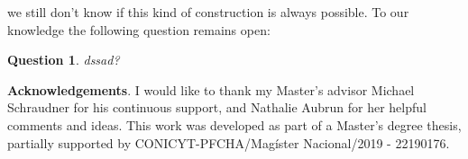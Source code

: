 \documentclass[letterpaper,10pt]{article}
\theoremstyle{plain}
\newtheorem*{question*}{Question}
\begin{document}
	
	\newpage 
	
we still don't know if this kind of construction is always possible. To our knowledge the following question remains open:
	\begin{question*}
	dssad?
	\end{question*}
	
	
	\textbf{Acknowledgements}. I would like to thank my Master's advisor Michael Schraudner for his continuous support, and Nathalie Aubrun for her helpful comments and ideas. This work was developed as part of a Master's degree thesis, partially supported by CONICYT-PFCHA/Magíster Nacional/2019 - 22190176.
	
	
	{}
\end{document}
